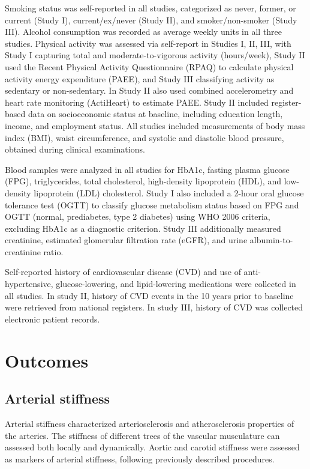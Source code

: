 \documentclass[
  a4paper,
  headsepline=true,
  open=any]{scrbook}
\begin{document}
Smoking status was self-reported in all studies, categorized as never,
former, or current (Study I), current/ex/never (Study II), and
smoker/non-smoker (Study III). Alcohol consumption was recorded as
average weekly units in all three studies. Physical activity was
assessed via self-report in Studies I, II, III, with Study I capturing
total and moderate-to-vigorous activity (hours/week), Study II used the
Recent Physical Activity Questionnaire (RPAQ) to calculate physical
activity energy expenditure (PAEE), and Study III classifying activity
as sedentary or non-sedentary. In Study II also used combined
accelerometry and heart rate monitoring (ActiHeart) to estimate PAEE.
Study II included register-based data on socioeconomic status at
baseline, including education length, income, and employment status. All
studies included measurements of body mass index (BMI), waist
circumference, and systolic and diastolic blood pressure, obtained
during clinical examinations.

Blood samples were analyzed in all studies for HbA1c, fasting plasma
glucose (FPG), triglycerides, total cholesterol, high-density
lipoprotein (HDL), and low-density lipoprotein (LDL) cholesterol. Study
I also included a 2-hour oral glucose tolerance test (OGTT) to classify
glucose metabolism status based on FPG and OGTT (normal, prediabetes,
type 2 diabetes) using WHO 2006 criteria, excluding HbA1c as a
diagnostic criterion. Study III additionally measured creatinine,
estimated glomerular filtration rate (eGFR), and urine
albumin-to-creatinine ratio.

Self-reported history of cardiovascular disease (CVD) and use of
anti-hypertensive, glucose-lowering, and lipid-lowering medications were
collected in all studies. In study II, history of CVD events in the 10
years prior to baseline were retrieved from national registers. In study
III, history of CVD was collected electronic patient records.

\hypertarget{outcomes}{%
\section{Outcomes}\label{outcomes}}

\hypertarget{arterial-stiffness}{%
\subsection{Arterial stiffness}\label{arterial-stiffness}}

Arterial stiffness characterized arteriosclerosis and atherosclerosis
properties of the arteries. The stiffness of different trees of the
vascular musculature can assessed both locally and dynamically. Aortic
and carotid stiffness were assessed as markers of arterial stiffness,
following previously described procedures.
\end{document}
